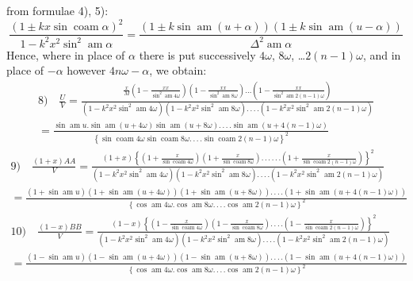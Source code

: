 \documentclass{article}
\begin{document}
from formulae 4), 5):
\[
\frac{\left(1\pm kx\sin\operatorname{coam}\alpha\right)^{2}}{1-k^{2}x^{2}\sin^{2}\operatorname{am}\alpha}=\frac{\left(1\pm k\sin\operatorname{am}(u+\alpha)\right)\left(1\pm k\sin\operatorname{am}(u-\alpha)\right)}{\Delta^{2}\operatorname{am}\alpha}
\]
Hence, where in place of $\alpha$ there is put successively $4\omega$, $8\omega$, \ldots $2(n-1)\omega$, and in place of $-\alpha$ however $4n\omega-\alpha$, we obtain:
\[
\begin{gathered}
\text{8)}\quad\frac{U}{V}=\frac{\frac{x}{M}\left(1-\frac{xx}{\sin^{2}\operatorname{am}4\omega}\right)\left(1-\frac{xx}{\sin^{2}\operatorname{am}8\omega}\right)\ldots\left(1-\frac{xx}{\sin^{2}\operatorname{am}2(n-1)\omega}\right)}{\left(1-k^{2}x^{2}\sin^{2}\operatorname{am}4\omega\right)\left(1-k^{2}x^{2}\sin^{2}\operatorname{am}8\omega\right).\,.\,.\,.\left(1-k^{2}x^{2}\sin^{2}\operatorname{am}2(n-1)\omega\right)}\\[1.5ex]
=\frac{\sin\operatorname{am}u.\sin\operatorname{am}(u+4\omega)\sin\operatorname{am}(u+8\omega).\,.\,.\,.\sin\operatorname{am}(u+4(n-1)\omega)}{\left\{\sin\operatorname{coam}4\omega\sin\operatorname{coam}8\omega.\,.\,.\,.\sin\operatorname{coam}2(n-1)\omega\right\}^{2}}
\end{gathered}
\]
\[
\begin{gathered}
\text{9)}\quad\frac{(1+x)AA}{V}=\frac{(1+x)\left\{\left(1+\frac{x}{\sin\operatorname{coam}4\omega}\right)\left(1+\frac{x}{\sin\operatorname{coam}8\omega}\right).\,.\,.\,.\,.\,.\left(1+\frac{x}{\sin\operatorname{coam}2(n-1)\omega}\right)\right\}^{2}}{\left(1-k^{2}x^{2}\sin^{2}\operatorname{am}4\omega\right)\left(1-k^{2}x^{2}\sin^{2}\operatorname{am}8\omega\right).\,.\,.\,.\left(1-k^{2}x^{2}\sin^{2}\operatorname{am}2(n-1)\omega\right)}\\[1.5ex]
=\frac{\left(1+\sin\operatorname{am}u\right)\left(1+\sin\operatorname{am}(u+4\omega)\right)\left(1+\sin\operatorname{am}(u+8\omega)\right).\,.\,.\,.\left(1+\sin\operatorname{am}(u+4(n-1)\omega)\right)}{\left\{\cos\operatorname{am}4\omega.\cos\operatorname{am}8\omega.\,.\,.\,.\cos\operatorname{am}2(n-1)\omega\right\}^{2}}
\end{gathered}
\]
\[
\begin{gathered}
\text{10)}\quad\frac{(1-x)BB}{V}=\frac{(1-x)\left\{\left(1-\frac{x}{\sin\operatorname{coam}4\omega}\right)\left(1-\frac{x}{\sin\operatorname{coam}8\omega}\right).\,.\,.\,.\left(1-\frac{x}{\sin\operatorname{coam}2(n-1)\omega}\right)\right\}^{2}}{\left(1-k^{2}x^{2}\sin^{2}\operatorname{am}4\omega\right)\left(1-k^{2}x^{2}\sin^{2}\operatorname{am}8\omega\right).\,.\,.\,.\left(1-k^{2}x^{2}\sin^{2}\operatorname{am}2(n-1)\omega\right)}\\[1.5ex]
=\frac{\left(1-\sin\operatorname{am}u\right)\left(1-\sin\operatorname{am}(u+4\omega)\right)\left(1-\sin\operatorname{am}(u+8\omega)\right).\,.\,.\,.\left(1-\sin\operatorname{am}(u+4(n-1)\omega)\right)}{\left\{\cos\operatorname{am}4\omega.\cos\operatorname{am}8\omega.\,.\,.\,.\cos\operatorname{am}2(n-1)\omega\right\}^{2}}
\end{gathered}
\]
\end{document}
